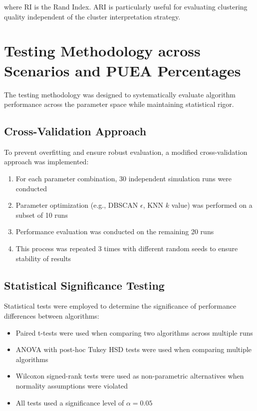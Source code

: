 where RI is the Rand Index. ARI is particularly useful for evaluating clustering quality independent of the cluster interpretation strategy.

\section{Testing Methodology across Scenarios and PUEA Percentages}

The testing methodology was designed to systematically evaluate algorithm performance across the parameter space while maintaining statistical rigor.

\subsection{Cross-Validation Approach}

To prevent overfitting and ensure robust evaluation, a modified cross-validation approach was implemented:

\begin{enumerate}
    \item For each parameter combination, 30 independent simulation runs were conducted
    \item Parameter optimization (e.g., DBSCAN $\epsilon$, KNN $k$ value) was performed on a subset of 10 runs
    \item Performance evaluation was conducted on the remaining 20 runs
    \item This process was repeated 3 times with different random seeds to ensure stability of results
\end{enumerate}

\subsection{Statistical Significance Testing}

Statistical tests were employed to determine the significance of performance differences between algorithms:

\begin{itemize}
    \item Paired t-tests were used when comparing two algorithms across multiple runs
    \item ANOVA with post-hoc Tukey HSD tests were used when comparing multiple algorithms
    \item Wilcoxon signed-rank tests were used as non-parametric alternatives when normality assumptions were violated
    \item All tests used a significance level of $\alpha = 0.05$
\end{itemize}

